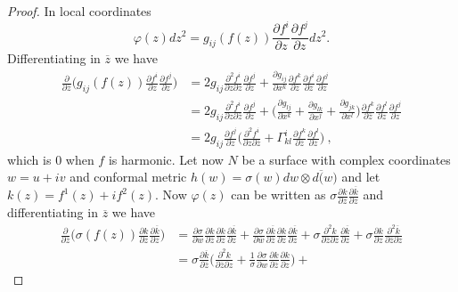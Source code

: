 \begin{proof}
    In local coordinates
    \[
        \varphi(z)dz^2 = g_{ij}(f(z)) \frac{\partial f^i}{\partial z}  \frac{\partial f^j}{\partial z} dz^2. 
    \]
    Differentiating in $\overline{z}$ we have
    \[
    \begin{split}
       \frac{ \partial}{\partial \overline{z}} \Big(g_{ij}(f(z)) \frac{\partial f^i}{\partial z}  \frac{\partial f^j}{\partial z} \Big) & = 2 g_{ij} \frac{\partial^2 f^i}{\partial z \partial \overline{z}} \frac{\partial f^j}{\partial z} + \frac{\partial g_{ij}}{\partial x^k} \frac{\partial f^k}{\partial \overline{z}} \frac{\partial f^i}{\partial z} \frac{\partial f^j}{\partial z} \\
       & = 2 g_{ij} \frac{\partial^2 f^i}{\partial z \partial \overline{z}} \frac{\partial f^j}{\partial z} + \Big(\frac{\partial g_{lj}}{\partial x^k} + \frac{\partial g_{lk}}{\partial x^j} + \frac{\partial g_{jk}}{\partial x^l} \Big) \frac{\partial f^k}{\partial \overline{z}} \frac{\partial f^l}{\partial z} \frac{\partial f^j}{\partial z}  \\
       & = 2 g_{ij} \frac{\partial f^j}{\partial z} \Big( \frac{\partial^2 f^i}{\partial z \partial \overline{z}} + \Gamma^i_{kl}  \frac{\partial f^k}{\partial \overline{z}} \frac{\partial f^l}{\partial z} \Big) \ ,
    \end{split}
    \]
    which is $0$ when $f$ is harmonic.
    Let now $N$ be a surface with complex coordinates $w = u + iv$ and conformal metric $h(w) = \sigma(w) dw \otimes d\overline(w)$ and let $k(z) = f^1(z) + if^2(z)$. Now $\varphi(z)$ can be written as $\sigma \frac{\partial k}{ \partial z} \frac{\partial \overline{k}}{\partial z}$ and differentiating in $\overline{z}$ we have
    \[
    \begin{split}
        \frac{ \partial}{\partial \overline{z}}\Big(\sigma(f(z)) \frac{\partial k}{ \partial z}  \frac{\partial \overline{k}}{\partial z} \Big) & = 
        \frac{\partial \sigma}{\partial w} \frac{\partial k}{\partial \overline{z}} \frac{\partial k}{ \partial z} \frac{\partial \overline{k}}{\partial z} +
        \frac{\partial \sigma}{\partial \overline{w}} \frac{\partial \overline{k}}{\partial \overline{z}} \frac{\partial k}{ \partial z} \frac{\partial \overline{k}}{\partial z} +
        \sigma \frac{\partial^2 k}{\partial \overline{z} \partial z} \frac{\partial \overline{k}}{\partial z} +
        \sigma \frac{\partial k}{ \partial z} \frac{\partial^2 \overline{k}}{\partial \overline{z} \partial z} \\
        & = \sigma \frac{\partial \overline{k}}{\partial \overline{z}} \Big( \frac{\partial^2 k}{\partial \overline{z} \partial z} + \frac{1}{\sigma} \frac{\partial \sigma}{\partial w} \frac{\partial k}{\partial \overline{z}} \frac{\partial k}{ \partial z}  \Big) + 

\end{split}\]
\end{proof}
